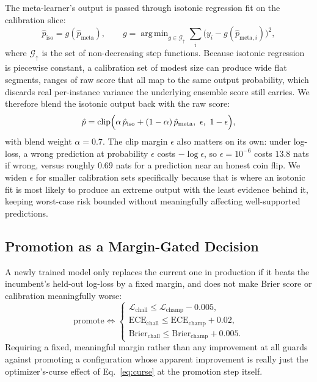 \documentclass[conference]{IEEEtran}
\DeclareMathOperator*{\argmin}{arg\,min}
\begin{document}
The meta-learner's output is passed through isotonic regression fit on
the calibration slice:
\begin{equation}
  \hat{p}_{\text{iso}} = g(\hat{p}_{\text{meta}}), \qquad
  g = \argmin_{g \in \mathcal{G}_{\uparrow}} \sum_i \bigl(y_i - g(\hat{p}_{\text{meta},i})\bigr)^2,
\label{eq:isotonic}
\end{equation}
where $\mathcal{G}_{\uparrow}$ is the set of non-decreasing step
functions. Because isotonic regression is piecewise constant, a
calibration set of modest size can produce wide flat segments, ranges
of raw score that all map to the same output probability, which
discards real per-instance variance the underlying ensemble score
still carries. We therefore blend the isotonic output back with the
raw score:
\begin{equation}
  \hat{p} = \operatorname{clip}\Bigl(\alpha\, \hat{p}_{\text{iso}} + (1-\alpha)\, \hat{p}_{\text{meta}},\ \epsilon,\ 1-\epsilon\Bigr),
\label{eq:blend}
\end{equation}
with blend weight $\alpha = 0.7$. The clip margin $\epsilon$ also
matters on its own: under log-loss, a wrong prediction at probability
$\epsilon$ costs $-\log \epsilon$, so $\epsilon = 10^{-6}$ costs
$13.8$ nats if wrong, versus roughly $0.69$ nats for a prediction near
an honest coin flip. We widen $\epsilon$ for smaller calibration sets
specifically because that is where an isotonic fit is most likely to
produce an extreme output with the least evidence behind it, keeping
worst-case risk bounded without meaningfully affecting well-supported
predictions.

\subsection{Promotion as a Margin-Gated Decision}

A newly trained model only replaces the current one in production if
it beats the incumbent's held-out log-loss by a fixed margin, and does
not make Brier score or calibration meaningfully worse:
\begin{equation}
  \text{promote} \iff
  \begin{cases}
    \mathcal{L}_{\text{chall}} \le \mathcal{L}_{\text{champ}} - 0.005, \\
    \text{ECE}_{\text{chall}} \le \text{ECE}_{\text{champ}} + 0.02, \\
    \text{Brier}_{\text{chall}} \le \text{Brier}_{\text{champ}} + 0.005.
  \end{cases}
\label{eq:promote}
\end{equation}
Requiring a fixed, meaningful margin rather than any improvement at
all guards against promoting a configuration whose apparent
improvement is really just the optimizer's-curse effect of
Eq.~\eqref{eq:curse} at the promotion step itself.
\end{document}

